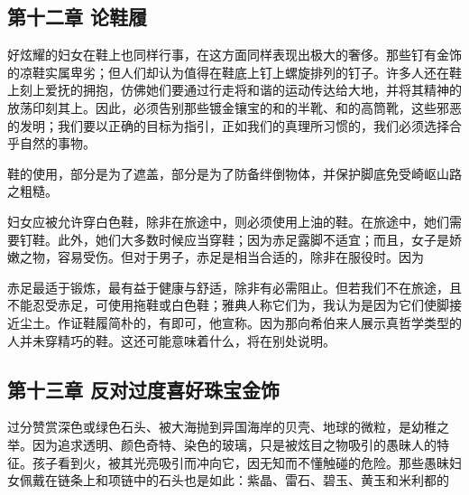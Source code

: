 
\subsection{第十二章  论鞋履}

好炫耀的妇女在鞋上也同样行事，在这方面同样表现出极大的奢侈。那些钉有金饰的凉鞋实属卑劣；但人们却认为值得在鞋底上钉上螺旋排列的钉子。许多人还在鞋上刻上爱抚的拥抱，仿佛她们要通过行走将和谐的运动传达给大地，并将其精神的放荡印刻其上。因此，必须告别那些镀金镶宝的和的半靴、和的高筒靴，这些邪恶的发明；我们要以正确的目标为指引，正如我们的真理所习惯的，我们必须选择合乎自然的事物。\par

鞋的使用，部分是为了遮盖，部分是为了防备绊倒物体，并保护脚底免受崎岖山路之粗糙。\par

妇女应被允许穿白色鞋，除非在旅途中，则必须使用上油的鞋。在旅途中，她们需要钉鞋。此外，她们大多数时候应当穿鞋；因为赤足露脚不适宜；而且，女子是娇嫩之物，容易受伤。但对于男子，赤足是相当合适的，除非在服役时。因为\par

赤足最适于锻炼，最有益于健康与舒适，除非有必需阻止。但若我们不在旅途，且不能忍受赤足，可使用拖鞋或白色鞋；雅典人称它们为，我认为是因为它们使脚接近尘土。作证鞋履简朴的，有即可，他宣称。因为那向希伯来人展示真哲学类型的人并未穿精巧的鞋。这还可能意味着什么，将在别处说明。\par


\subsection{第十三章  反对过度喜好珠宝金饰}

过分赞赏深色或绿色石头、被大海抛到异国海岸的贝壳、地球的微粒，是幼稚之举。因为追求透明、颜色奇特、染色的玻璃，只是被炫目之物吸引的愚昧人的特征。孩子看到火，被其光亮吸引而冲向它，因无知而不懂触碰的危险。那些愚昧妇女佩戴在链条上和项链中的石头也是如此：紫晶、雷石、碧玉、黄玉和米利都的\par

\par

